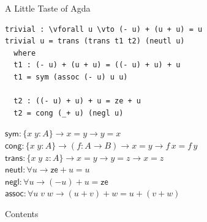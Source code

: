 \documentclass[aspectratio=43]{beamer}
\newcommand{\vforall}{\makebox[\fontcharwd\font`x]{$\forall$}}
\newcommand{\vto}{\makebox[2\fontcharwd\font`x]{$\to$}}
\begin{document}
\begin{frame}[fragile]{A Little Taste of Agda}
\begin{Verbatim}[fontsize=\footnotesize, frame=single, commandchars=\\\{\}]
trivial : \vforall u \vto (- u) + (u + u) = u
trivial u = trans (trans t1 t2) (neutl u)
  where
  t1 : (- u) + (u + u) = ((- u) + u) + u
  t1 = sym (assoc (- u) u u)

  t2 : ((- u) + u) + u = ze + u
  t2 = cong (_+ u) (negl u)
\end{Verbatim}
    \vfill
    {\footnotesize $\mathsf{sym} : \{x\;y : A\} \to x = y \to y = x$ \\}
    {\footnotesize $\mathsf{cong} : \{x\;y : A\} \to (f : A \to B) \to x = y \to f\,x = f\,y$ \\}
    {\footnotesize $\mathsf{trans} : \{x\;y\;z : A\} \to x = y \to y = z \to x = z$ \\}
    {\footnotesize $\mathsf{neutl} : \forall u \to \mathsf{ze} + u = u$ \\}
    {\footnotesize $\mathsf{negl} : \forall u \to (-u) + u = \mathsf{ze}$ \\}
    {\footnotesize $\mathsf{assoc} : \forall u\;v\;w \to (u + v) + w = u + (v + w)$ \\}
\end{frame}

\begin{frame}{Contents}
    \tableofcontents
\end{frame}
\end{document}
